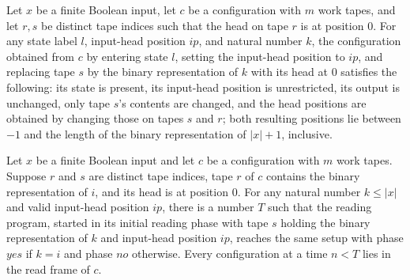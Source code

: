 \begin{theorem}
\label{Complexity.LogProg.readFrame_at}
\leanok
{}
Let $x$ be a finite Boolean input, let $c$ be a configuration with $m$ work tapes, and
let $r,s$ be distinct tape indices such that the head on tape $r$ is at position $0$.
For any state label $l$, input-head position $ip$, and natural number $k$, the
configuration obtained from $c$ by entering state $l$, setting the input-head position
to $ip$, and replacing tape $s$ by the binary representation of $k$ with its head at $0$
satisfies the following: its state is present, its input-head position is unrestricted,
its output is unchanged, only tape $s$'s contents are changed, and the head positions
are obtained by changing those on tapes $s$ and $r$; both resulting positions lie
between $-1$ and the length of the binary representation of $|x|+1$, inclusive.
\end{theorem}

\begin{theorem}
\label{Complexity.LogProg.read_eq}
\leanok
{}
Let $x$ be a finite Boolean input and let $c$ be a configuration with $m$ work tapes.
Suppose $r$ and $s$ are distinct tape indices, tape $r$ of $c$ contains the binary
representation of $i$, and its head is at position $0$. For any natural number $k\le
|x|$ and valid input-head position $ip$, there is a number $T$ such that the reading
program, started in its initial reading phase with tape $s$ holding the binary
representation of $k$ and input-head position $ip$, reaches the same setup with phase
$yes$ if $k=i$ and phase $no$ otherwise. Every configuration at a time $n<T$ lies in the
read frame of $c$.
\end{theorem}

